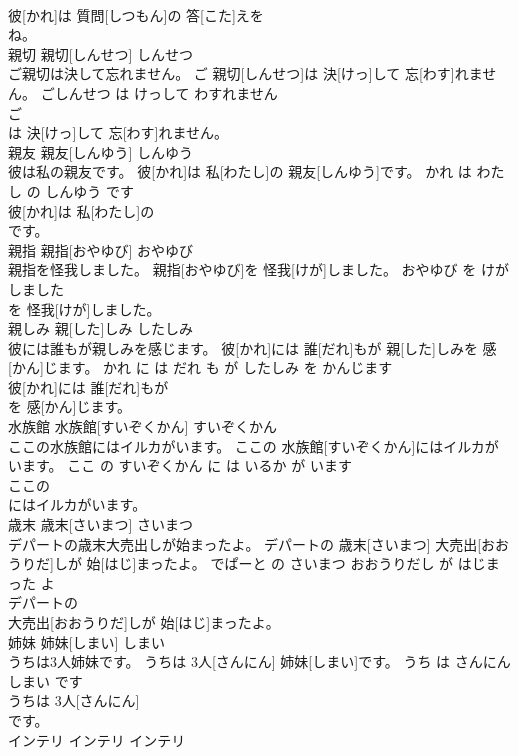 \documentclass[8pt]{extreport}
\begin{document}
\begin{CJK}{UTF8}{min}
\\	彼[かれ]は 質問[しつもん]の 答[こた]えを
\\	ね。			
\\	親切	親切[しんせつ]	しんせつ	
\\	ご親切は決して忘れません。	ご 親切[しんせつ]は 決[けっ]して 忘[わす]れません。	ごしんせつ は けっして わすれません	
\\	ご
\\	は 決[けっ]して 忘[わす]れません。			
\\	親友	親友[しんゆう]	しんゆう	
\\	彼は私の親友です。	彼[かれ]は 私[わたし]の 親友[しんゆう]です。	かれ は わたし の しんゆう です	
\\	彼[かれ]は 私[わたし]の
\\	です。			
\\	親指	親指[おやゆび]	おやゆび	
\\	親指を怪我しました。	親指[おやゆび]を 怪我[けが]しました。	おやゆび を けがしました	
\\	を 怪我[けが]しました。			
\\	親しみ	親[した]しみ	したしみ	
\\	彼には誰もが親しみを感じます。	彼[かれ]には 誰[だれ]もが 親[した]しみを 感[かん]じます。	かれ に は だれ も が したしみ を かんじます	
\\	彼[かれ]には 誰[だれ]もが
\\	を 感[かん]じます。			
\\	水族館	水族館[すいぞくかん]	すいぞくかん	
\\	ここの水族館にはイルカがいます。	ここの 水族館[すいぞくかん]にはイルカがいます。	ここ の すいぞくかん に は いるか が います	
\\	ここの
\\	にはイルカがいます。			
\\	歳末	歳末[さいまつ]	さいまつ	
\\	デパートの歳末大売出しが始まったよ。	デパートの 歳末[さいまつ] 大売出[おおうりだ]しが 始[はじ]まったよ。	でぱーと の さいまつ おおうりだし が はじまった よ	
\\	デパートの
\\	大売出[おおうりだ]しが 始[はじ]まったよ。			
\\	姉妹	姉妹[しまい]	しまい	
\\	うちは3人姉妹です。	うちは 3人[さんにん] 姉妹[しまい]です。	うち は さんにん しまい です	
\\	うちは 3人[さんにん]
\\	です。			
\\	インテリ	インテリ	インテリ	

\end{CJK}
\end{document}
